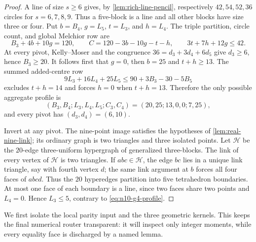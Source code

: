 \begin{proof}
A line of size $s\ge6$ gives, by \cref{lem:rich-line-pencil}, respectively
$42,54,52,36$ circles for $s=6,7,8,9$.  Thus a five-block is a line and
all other blocks have size three or four.  Put
$b=B_4$, $g=L_5$, $t=L_3$, and $h=L_4$.  The triple partition, circle count,
and global Melchior row are
\[
 B_3+4b+10g=120,\qquad
 C=120-3b-10g-t-h,\qquad
 3t+7h+12g\le42.
\]
At every pivot, Kelly--Moser and the congruence
$36=d_3+3d_4+6d_5$ give $d_3\ge6$, hence $B_3\ge20$.  It follows first that
$g=0$, then $b=25$ and $t+h\ge13$.  The summed added-centre row
\[
 9L_3+16L_4+25L_5\le90+3B_3-30-5B_5
\]
excludes $t+h=14$ and forces $h=0$ when $t+h=13$.  Therefore the only
possible aggregate profile is
\begin{equation}\label{eq:n10-g4-profile}
(B_3,B_4;L_3,L_4,L_5;C_3,C_4)
 =(20,25;13,0,0;7,25),
\end{equation}
and every pivot has $(d_3,d_4)=(6,10)$.

Invert at any pivot.  The nine-point image satisfies the hypotheses of
\cref{lem:real-nine-link}; its ordinary graph is two triangles and three
isolated points.  Let $\mathcal H$ be the $20$-edge three-uniform
hypergraph of generalized three-blocks.  The link of every vertex of
$\mathcal H$ is two triangles.  If $abc\in\mathcal H$, the edge $bc$ lies
in a unique link triangle, say with fourth vertex $d$; the same link
argument at $b$ forces all four faces of $abcd$.  Thus the $20$ hyperedges
partition into five tetrahedron boundaries.  At most one face of each
boundary is a line, since two faces share two points and $L_4=0$.  Hence
$L_3\le5$, contrary to \eqref{eq:n10-g4-profile}.
\end{proof}

We first isolate the local parity input and the three geometric kernels.
This keeps the final numerical router transparent: it will inspect only
integer moments, while every equality face is discharged by a named lemma.

